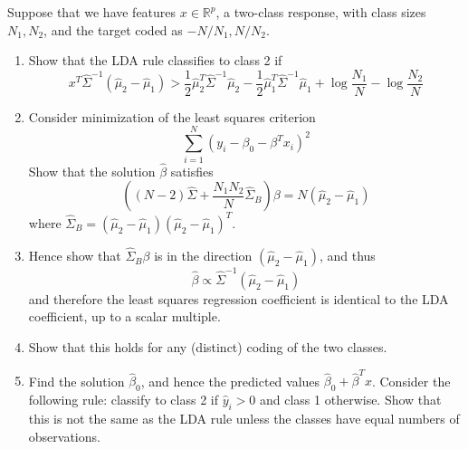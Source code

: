 \begin{exer}
    Suppose that we have features $x \in \mathbb{R}^p$, a two-class response, with class sizes $N_1, N_2$, and the target coded as $-N/N_1, N/N_2$.

    \begin{enumerate}
        \item Show that the LDA rule classifies to class 2 if 
            \[
                x^T \hat \Sigma^{-1} (\hat \mu_2 - \hat \mu_1) > \frac{1}{2} \hat \mu_2^T \hat \Sigma^{-1} \hat \mu_2 - \frac{1}{2} \hat \mu_1^T \hat \Sigma^{-1} \hat \mu_1 + \log \frac{N_1}{N} - \log \frac{N_2}{N}
            \]
        \item Consider minimization of the least squares criterion 
            \[
                \sum_{i=1}^N \left(y_i - \beta_0 - \beta^T x_i \right)^2
            \]
            Show that the solution $\hat \beta$ satisfies 
            \[
                \left( (N-2) \hat \Sigma + \frac{N_1 N_2}{N} \hat \Sigma_B \right) \beta = N (\hat \mu_2 - \hat \mu_1 )
            \] where $\hat \Sigma_B = (\hat \mu_2 - \hat \mu_1) (\hat \mu_2 - \hat \mu_1)^T$.  
        \item Hence show that $\hat \Sigma_B \beta$ is in the direction $(\hat \mu_2 - \hat \mu_1)$, and thus \[
                \hat \beta \propto \hat \Sigma^{-1}(\hat \mu_2 - \hat \mu_1)
            \] and therefore the least squares regression coefficient is identical to the LDA coefficient, up to a scalar multiple. 
        \item Show that this holds for any (distinct) coding of the two classes.  
        \item Find the solution $\hat \beta_0$, and hence the predicted values $\hat \beta_0 + \hat \beta^T x$.  Consider the following rule: classify to class 2 if $\hat y_i > 0$ and class 1 otherwise.  Show that this is not the same as the LDA rule unless the classes have equal numbers of observations.
    \end{enumerate}
\end{exer}


